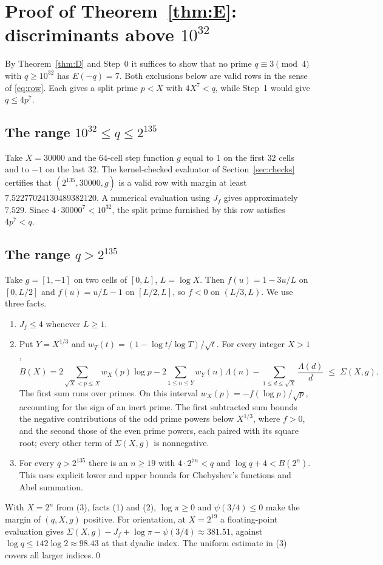 \documentclass[11pt]{amsart}
\theoremstyle{remark}
\begin{document}
\section{Proof of Theorem~\ref{thm:E}: discriminants above \texorpdfstring{$10^{32}$}{10\string^32}}\label{sec:E}

By Theorem~\ref{thm:D} and Step~0 it suffices to show that no prime $q\equiv3\pmod4$ with $q\ge10^{32}$ has $E(-q)=7$. Both exclusions below are valid rows in the sense of \eqref{eq:row}. Each gives a split prime $p<X$ with $4X^7<q$, while Step~1 would give $q\le4p^7$.

\subsection*{The range \texorpdfstring{$10^{32}\le q\le2^{135}$}{10\string^32 <= q <= 2\string^135}}
Take $X=30000$ and the $64$-cell step function $g$ equal to $1$ on the first $32$ cells and to $-1$ on the last $32$. The kernel-checked evaluator of Section~\ref{sec:checks} certifies that $(2^{135},30000,g)$ is a valid row with margin at least $7.52277024130489382120$. A numerical evaluation using $J_f$ gives approximately $7.529$. Since $4\cdot30000^7<10^{32}$, the split prime furnished by this row satisfies $4p^7<q$.

\subsection*{The range \texorpdfstring{$q>2^{135}$}{q > 2\string^135}}
Take $g=[1,-1]$ on two cells of $[0,L]$, $L=\log X$. Then $f(u)=1-3u/L$ on $[0,L/2]$ and $f(u)=u/L-1$ on $[L/2,L]$, so $f<0$ on $(L/3,L)$. We use three facts.
\begin{enumerate}
\item $J_f\le4$ whenever $L\ge1$.
\item Put $Y=X^{1/3}$ and $w_T(t)=(1-\log t/\log T)/\sqrt t$. For every integer $X>1$,
\[
 B(X)=2\!\sum_{\sqrt X<p\le X} w_X(p)\log p
      -2\!\sum_{1\le n\le Y} w_Y(n)\Lambda(n)
      -\!\sum_{1\le d\le\sqrt X}\frac{\Lambda(d)}{d}
      \;\le\;\Sigma(X,g).
\]
The first sum runs over primes. On this interval $w_X(p)=-f(\log p)/\sqrt p$, accounting for the sign of an inert prime. The first subtracted sum bounds the negative contributions of the odd prime powers below $X^{1/3}$, where $f>0$, and the second those of the even prime powers, each paired with its square root; every other term of $\Sigma(X,g)$ is nonnegative.
\item For every $q>2^{135}$ there is an $n\ge19$ with $4\cdot2^{7n}<q$ and $\log q+4<B(2^n)$. This uses explicit lower and upper bounds for Chebyshev's functions and Abel summation.
\end{enumerate}
With $X=2^n$ from (3), facts (1) and (2), $\log\pi\ge0$ and $\psi(3/4)\le0$ make the margin of $(q,X,g)$ positive. For orientation, at $X=2^{19}$ a floating-point evaluation gives $\Sigma(X,g)-J_f+\log\pi-\psi(3/4)\approx381.51$, against $\log q\le142\log2\approx98.43$ at that dyadic index. The uniform estimate in (3) covers all larger indices.\qed
\end{document}
